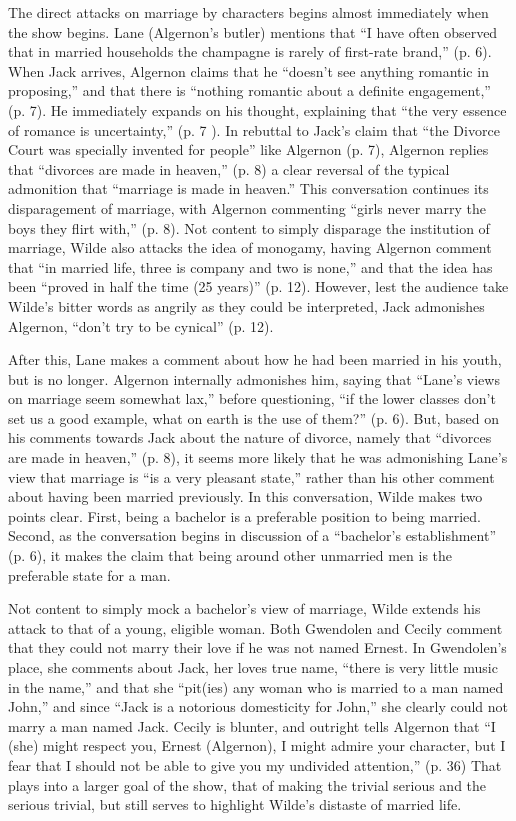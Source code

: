 \documentclass[12pt]{article}[titlepage]
\newcommand{\say}[1]{``#1''}
\newcommand{\1}{\={a}}
\newcommand{\2}{\={e}}
\newcommand{\3}{\={\i}}
\newcommand{\4}{\=o}
\newcommand{\5}{\=u}
\newcommand{\6}{\={A}}
\renewcommand{\,}{\textsuperscript{,}}
\begin{document}
The direct attacks on marriage by characters begins almost immediately when the show begins.
 Lane (Algernon's butler) mentions that \say{I have often observed that in married households the champagne is rarely of first-rate brand,} (p. 6).
When Jack arrives, Algernon claims that he \say{doesn't see anything romantic in proposing,} and that there is \say{nothing romantic about a definite engagement,} (p. 7).
He immediately expands on his thought, explaining that \say{the very essence of romance is uncertainty,} (p. 7 ).
In rebuttal to Jack's claim that \say{the Divorce Court was specially invented for people} like Algernon (p. 7), Algernon replies that \say{divorces are made in heaven,} (p. 8) a clear reversal of the typical admonition that \say{marriage is made in heaven.}
This conversation continues its disparagement of marriage, with Algernon commenting \say{girls never marry the boys they flirt with,} (p. 8).
Not content to simply disparage the institution of marriage, Wilde also attacks the idea of monogamy, having Algernon comment that \say{in married life, three is company and two is none,} and that the idea has been \say{proved in half the time (25 years)} (p. 12).
However, lest the audience take Wilde's bitter words as angrily as they could be interpreted, Jack admonishes Algernon, \say{don't try to be cynical} (p. 12).

After this, Lane makes a comment about how he had been married in his youth, but is no longer.
Algernon internally admonishes him, saying that \say{Lane's views on marriage seem somewhat lax,} before questioning, \say{if the lower classes don't set us a good example, what on earth is the use of them?} (p. 6).
But, based on his comments towards Jack about the nature of divorce, namely that \say{divorces are made in heaven,} (p. 8), it seems more likely that he was admonishing Lane's view that marriage is \say{is a very pleasant state,} rather than his other comment about having been married previously.
In this conversation, Wilde makes two points clear.
First, being a bachelor is a preferable position to being married.
Second, as the conversation begins in discussion of a \say{bachelor's establishment} (p. 6), it makes the claim that being around other unmarried men is the preferable state for a man.

Not content to simply mock a bachelor's view of marriage, Wilde extends his attack to that of a young, eligible woman.
Both Gwendolen and Cecily comment that they could not marry their love if he was not named Ernest.
In Gwendolen's place, she comments about Jack, her loves true name, \say{there is very little music in the name,} and that she \say{pit(ies) any woman who is married to a man named John,} and since \say{Jack is a notorious domesticity for John,} she clearly could not marry a man named Jack.
Cecily is blunter, and outright tells Algernon that \say{I (she) might respect you, Ernest (Algernon), I might admire your character, but I fear that I should not be able to give you my undivided attention,} (p. 36)
That plays into a larger goal of the show, that of making the trivial serious and the serious trivial, but still serves to highlight Wilde's distaste of married life.
\end{document}
